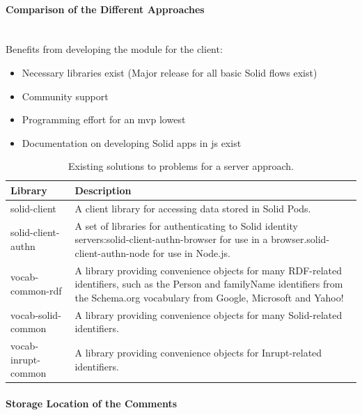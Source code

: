 \paragraph{Comparison of the Different Approaches}\mbox{}\\

Benefits from developing the module for the client:

\begin{itemize}
    \item Necessary libraries exist (Major release for all basic Solid flows exist)
    \item Community support
    \item Programming effort for an \gls{mvp} lowest
    \item Documentation on developing Solid apps in \gls{js} exist
\end{itemize}

\begin{table}[h!]
    \centering
    \begin{tabular}{| l | p{11cm} |} 
    \hline
     Library & Description \\
     \hline
      solid-client & A client library for accessing data stored in Solid Pods.  \\
      \hline
      solid-client-authn & A set of libraries for authenticating to Solid identity servers:solid-client-authn-browser for use in a browser.solid-client-authn-node for use in Node.js.  \\
      \hline
      vocab-common-rdf & A library providing convenience objects for many RDF-related identifiers, such as the Person and familyName identifiers from the Schema.org vocabulary from Google, Microsoft and Yahoo!  \\
      \hline
      vocab-solid-common & A library providing convenience objects for many Solid-related identifiers.  \\
      \hline
      vocab-inrupt-common & A library providing convenience objects for Inrupt-related identifiers.  \\
      \hline
    \end{tabular}
    \vspace{0.75cm}
    \caption{Existing solutions to problems for a server approach.}
    \label{table:4}
\end{table}
\vspace{0.5cm}
\paragraph{Storage Location of the Comments}\mbox{}\\

